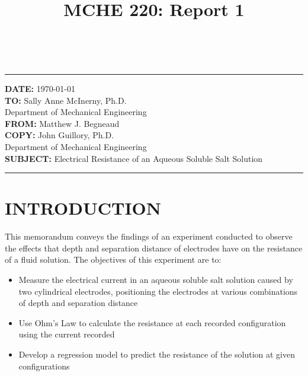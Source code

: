 \documentclass[12pt]{article}
\title{MCHE 220: Report 1}
\begin{document}
\fancyhf{}  
  \renewcommand{\headrulewidth}{0pt}
    \pagestyle{plain}
    
\captionsetup[table]{labelsep=space}

\begin{flushleft}
\hrulefill\\\hrule height 1pt
\vspace{5pt}
\textbf{DATE: }\today
\bigskip\\
\textbf{TO: }Sally Anne McInerny, Ph.D.\\ Department of Mechanical Engineering
\bigskip\\
\textbf{FROM: }Matthew J. Begneaud
\bigskip\\
\textbf{COPY: }John Guillory, Ph.D.\\ Department of Mechanical Engineering
\bigskip\\
\textbf{SUBJECT:} Electrical Resistance of an Aqueous Soluble Salt Solution
\vspace{-10pt}
\end{flushleft}
\hrulefill \hrule height 1pt


\section*{\fontsize{12}{12}\selectfont INTRODUCTION}
This memorandum conveys the findings of an experiment conducted to observe the effects that depth and separation distance of electrodes have on the resistance of a fluid solution. The objectives of this experiment are to:

\begin{itemize}

\item Measure the electrical current in an aqueous soluble salt solution caused by two cylindrical electrodes, positioning the electrodes at various combinations of depth and separation distance
\item Use Ohm's Law to calculate the resistance at each recorded configuration using the current recorded
\item Develop a regression model to predict the resistance of the solution at given configurations

\end{itemize}
\end{document}
